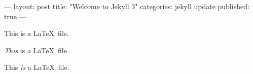 ---
layout: post
title:  "Welcome to Jekyll 3"
categories: jekyll update
published: true
---

This is a \LaTeX\ file. 

\emph{This} is a \LaTeX\ file. 

This \emph{is} a \LaTeX\ file.
